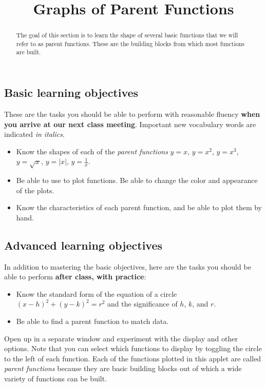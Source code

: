 \documentclass{ximera}
\title{Graphs of Parent Functions}
\begin{document}
\begin{abstract}
The goal of this section is to learn the shape of several basic functions that we will refer to as parent functions. These are the building blocks from which most functions are built.
\end{abstract}
\maketitle

\subsection*{Basic learning objectives}

These are the tasks you should be able to perform with reasonable fluency \textbf{when you arrive at our next class meeting}. Important new vocabulary words are indicated \emph{in italics}. 

\begin{itemize}
	\item Know the shapes of each of the \emph{parent functions} $y=x$, $y=x^2$, $y=x^3$, $y=\sqrt{x}$, $y=|x|$, $y=\frac{1}{x}$.
	\item Be able to use  to plot functions. Be able to change the color and appearance of the plots.
	\item Know the characteristics of each parent function, and be able to plot them by hand.
\end{itemize}

\subsection*{Advanced learning objectives}

In addition to mastering the basic objectives, here are the tasks you should be able to perform \textbf{after class, with practice}: 

\begin{itemize}
	\item Know the standard form of the equation of a circle $(x-h)^2+(y-k)^2=r^2$ and the significance of $h$, $k$, and $r$.
	\item Be able to find a parent function to match data.
\end{itemize}

\noindent\hrulefill

Open up  in a separate window and experiment with the display and other options. Note that you can select which functions to display by toggling the circle to the left of each function. Each of the functions plotted in this applet are called \emph{parent functions} because they are basic building blocks out of which a wide variety of functions can be built.
\end{document}
